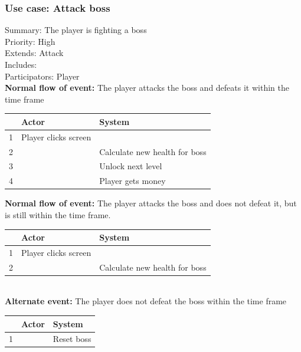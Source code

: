 \documentclass{article}
\begin{document}
\subsubsection{Use case: Attack boss}
Summary: The player is fighting a boss \\
Priority: High \\
Extends: Attack\\
Includes: \\
Participators: Player \\
\textbf{Normal flow of event:} The player attacks the boss and defeats it within the time frame 
\vspace{1 mm}\\
\begin{tabular}{|c|l|l|} \hline
    & Actor & System \\ \hline
    1 & Player clicks screen & \\ \hline
    2 & & Calculate new health for boss \\ \hline
    3 & & Unlock next level \\ \hline
    4 & & Player gets money \\ \hline
\end{tabular}
\newpage
\noindent
\textbf{Normal flow of event:} The player attacks the boss and does not defeat it, but is still within the time frame. 
\vspace{1 mm}\\
\begin{tabular}{|c|l|l|} \hline
    & Actor & System \\ \hline
    1 & Player clicks screen & \\ \hline
    2 & & Calculate new health for boss \\ \hline
\end{tabular}
\vspace{5 mm}\\
\textbf{Alternate event:} The player does not defeat the boss within the time frame 
\vspace{1 mm}\\
\begin{tabular}{|c|l|l|} \hline
    & Actor & System \\ \hline
    1 & & Reset boss \\ \hline
\end{tabular}

\vspace{5 mm}\\ 
\end{document}
